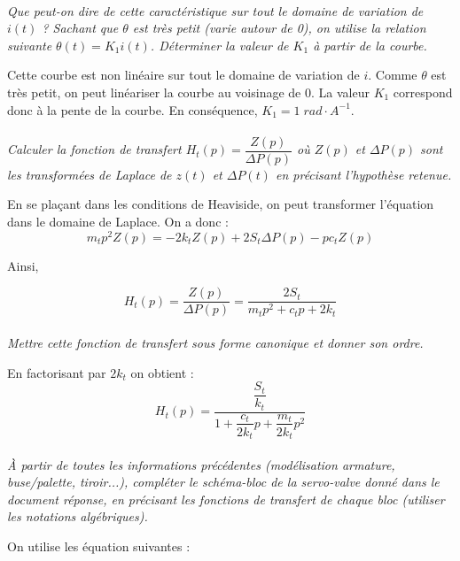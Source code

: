 \documentclass[10pt,oneside]{article}
\begin{document}
\paragraph{}
\textit{Que peut-on dire de cette caractéristique sur tout le domaine de variation de $i(t)$ ? Sachant
que $\theta$ est très petit (varie autour de 0), on utilise la relation suivante $\theta(t)=K_1i(t)$.
 Déterminer la valeur de $K_1$ à partir de la courbe.}

Cette courbe est non linéaire sur tout le domaine de variation de $i$. Comme
$\theta$ est très petit, on peut linéariser la courbe au voisinage de 0. La
valeur $K_1$ correspond donc à la pente  de la courbe. En conséquence,
$K_1=1\;rad\cdot A^{-1}$. 

\paragraph{}
\textit{Calculer la fonction de transfert $H_t(p)=\dfrac{Z(p)}{\Delta P(p)}$ 
où $Z(p)$ et $\Delta P(p)$ sont les transformées de Laplace de $z(t)$ et 
$\Delta P(t)$ en précisant l'hypothèse retenue.}

En se plaçant dans les conditions de Heaviside, on peut transformer l'équation
dans le domaine de Laplace. On a donc : 
$$
m_t p^2 Z(p) = -2k_t Z(p) + 2 S_t \Delta P(p) - pc_t Z(p)
$$

Ainsi, 

$$
H_t(p)=\dfrac{Z(p)}{\Delta P(p)} = \dfrac{2S_t}{m_tp^2+c_tp+2k_t}
$$

\paragraph{}
\textit{Mettre cette fonction de transfert sous forme canonique et donner son
ordre.}

En factorisant par $2k_t$ on obtient : 
$$
H_t(p)= \dfrac{\dfrac{S_t}{k_t}}{1+\dfrac{c_t}{2k_t}p+\dfrac{m_t}{2k_t}p^2}
$$

\paragraph{}
\textit{\`A partir de toutes les informations précédentes (modélisation armature, buse/palette,
tiroir...), compléter le schéma-bloc de la servo-valve donné dans le document réponse, en précisant les
fonctions de transfert de chaque bloc (utiliser les notations algébriques).}

On utilise les équation suivantes : 
\end{document}
